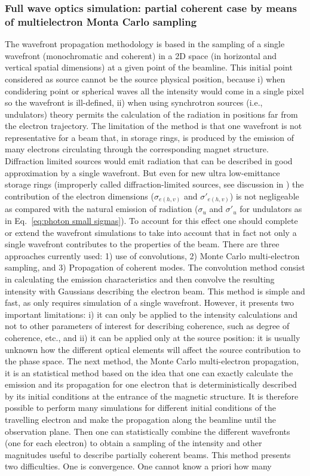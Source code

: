\documentclass{iucr}              %
\begin{document}
\subsubsection{Full wave optics simulation: partial coherent case by means of multielectron Monta Carlo sampling}
The wavefront propagation methodology is based in the sampling of a single wavefront (monochromatic and coherent) in a 2D space (in horizontal and vertical spatial dimensions) at a given point of the beamline. This initial point considered as source cannot be the source physical position, because i) when condidering point or spherical waves all the intensity would come in a single pixel so the wavefront is ill-defined, ii) when using synchrotron sources (i.e., undulators) theory \cite{jackson} permits the calculation of the radiation in positions far from the electron trajectory. The limitation of the method is that one wavefront is not representative for a beam that, in storage rings, is produced by the emission of many electrons circulating through the corresponding magnet structure. Diffraction limited sources would emit radiation that can be described in good approximation by a single wavefront. But even for new ultra low-emittance storage rings (improperly called diffraction-limited sources, see discussion in \cite{coherentfraction}) the contribution of the electron dimensions ($\sigma_{e(h,v)}$ and $\sigma'_{e(h,v)}$) is not negligeable as compared with the natural emission of radiation ($\sigma_u$ and $\sigma'_u$ for undulators as in Eq.~\ref{eq:photon small sigmas}). To account for this effect one should complete or extend the wavefront simulations to take into account that in fact not only a single wavefront contributes to the properties of the beam. There are three approaches currently used: 1) use of convolutions, 2) Monte Carlo multi-electron sampling, and 3) Propagation of coherent modes. The convolution method consist in calculating the emission characteristics and then convolve the resulting intensity with Gaussians describing the electron beam. This method is simple and fast, as only requires simulation of a single wavefront. However, it presents two important limitations: i) it can only be applied to the intensity calculations and not to other parameters of interest for describing coherence, such as degree of coherence, etc., and ii) it can be applied only at the source position: it is usually unknown how the different optical elements will affect the source contribution to the phase space. The next method, the Monte Carlo multi-electron propagation, it is an statistical method based on the idea that one can exactly calculate the emission and its propagation for one electron that is deterministically described by its initial conditions at the entrance of the magnetic structure. It is therefore possible to perform many simulations for different initial conditions of the travelling electron and make the propagation along the beamline until the observation plane. Then one can statistically combine the different wavefronts (one for each electron) to obtain a sampling of the intensity and other magnitudes useful to describe partially coherent beams. This method presents two difficulties. One is convergence. One cannot know a priori how many 
\end{document}

